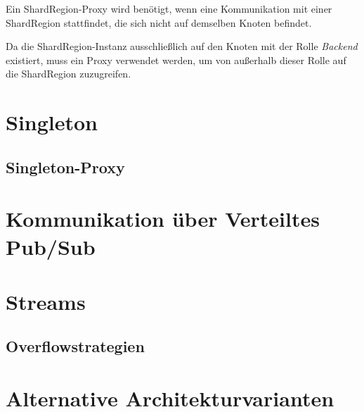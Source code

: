 Ein ShardRegion-Proxy wird benötigt, wenn eine Kommunikation mit einer ShardRegion stattfindet, die sich nicht auf demselben Knoten befindet\parencite{getakka_cluster_sharding}.

Da die ShardRegion-Instanz ausschließlich auf den Knoten mit der Rolle \textit{Backend} existiert, muss ein Proxy verwendet werden, um von außerhalb dieser Rolle auf die ShardRegion zuzugreifen.

\section{Singleton}




\subsection{Singleton-Proxy}

\section{Kommunikation über Verteiltes Pub/Sub}

\section{Streams}

\subsection{Overflowstrategien}


\section{Alternative Architekturvarianten}
